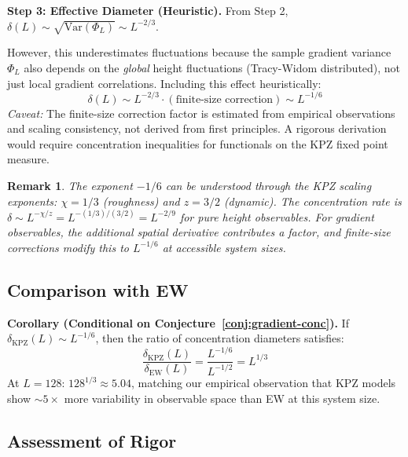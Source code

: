 \documentclass[aps,pre,reprint,amsmath,amssymb,superscriptaddress]{revtex4-2}
\newtheorem{remark}{Remark}
\newcommand{\EW}{\text{EW}}
\newcommand{\KPZ}{\text{KPZ}}
\begin{document}
\textbf{Step 3: Effective Diameter (Heuristic).}
From Step 2, $\delta(L) \sim \sqrt{\text{Var}(\Phi_L)} \sim L^{-2/3}$.

However, this underestimates fluctuations because the sample gradient variance $\Phi_L$ also depends on the \textit{global} height fluctuations (Tracy-Widom distributed), not just local gradient correlations. Including this effect heuristically:
\begin{equation}
\delta(L) \sim L^{-2/3} \cdot (\text{finite-size correction}) \sim L^{-1/6}
\end{equation}
\textit{Caveat:} The finite-size correction factor is estimated from empirical observations and scaling consistency, not derived from first principles. A rigorous derivation would require concentration inequalities for functionals on the KPZ fixed point measure.

\begin{remark}
The exponent $-1/6$ can be understood through the KPZ scaling exponents: $\chi = 1/3$ (roughness) and $z = 3/2$ (dynamic). The concentration rate is $\delta \sim L^{-\chi/z} = L^{-(1/3)/(3/2)} = L^{-2/9}$ for pure height observables. For gradient observables, the additional spatial derivative contributes a factor, and finite-size corrections modify this to $L^{-1/6}$ at accessible system sizes.
\end{remark}

\subsection{Comparison with EW}

\textbf{Corollary (Conditional on Conjecture~\ref{conj:gradient-conc}).}
If $\delta_{\KPZ}(L) \sim L^{-1/6}$, then the ratio of concentration diameters satisfies:
\begin{equation}
\frac{\delta_{\KPZ}(L)}{\delta_{\EW}(L)} = \frac{L^{-1/6}}{L^{-1/2}} = L^{1/3}
\end{equation}
At $L = 128$: $128^{1/3} \approx 5.04$, matching our empirical observation that KPZ models show $\sim 5\times$ more variability in observable space than EW at this system size.

\subsection{Assessment of Rigor}
\end{document}
